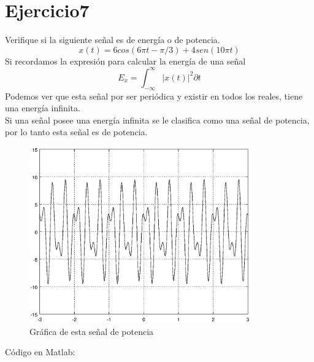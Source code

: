 \documentclass[10pt,a4paper]{report}
\begin{document}
\section{Ejercicio7}
Verifique si la siguiente señal es de energía o de potencia.\\
\[ x(t)=6cos(6\pi t-\pi/3)+4sen(10\pi t) \]
Si recordamos la expresión para calcular la energía de una señal\\
\[ E_{ x }=\int _{ -\infty  }^{ \infty  }{ \left| x(t) \right| ^{ 2 } \partial t} \]
Podemos ver que esta señal por ser periódica y existir en todos los reales, tiene una energía infinita.\\
Si una señal posee una energía infinita se le clasifica como una señal de potencia, por lo tanto esta señal es de potencia.

\begin{figure}[H]
  \begin{center}
    \includegraphics[width=0.85\textwidth]{./Ejercicio7/Potencia}
    \caption{Gráfica de esta señal de potencia}
    \label{fig:Pot}
  \end{center}
\end{figure}

Código en Matlab:
    
\end{document}

